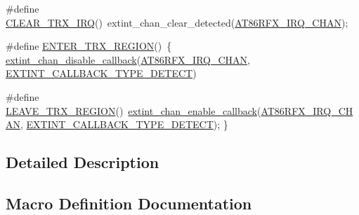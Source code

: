 \begin{DoxyCompactItemize}
\item 
\#define \mbox{\hyperlink{group__samd21__xplained__pro__group_gabb7258badbff68701ce350d608efe151}{C\+L\+E\+A\+R\+\_\+\+T\+R\+X\+\_\+\+I\+RQ}}()~extint\+\_\+chan\+\_\+clear\+\_\+detected(\mbox{\hyperlink{group__samd21__xplained__pro__group_ga59510bd28b7214b82000a06004731a8d}{A\+T86\+R\+F\+X\+\_\+\+I\+R\+Q\+\_\+\+C\+H\+AN}});
\item 
\#define \mbox{\hyperlink{group__samd21__xplained__pro__group_ga03364b3677b884617c15b752d8339e18}{E\+N\+T\+E\+R\+\_\+\+T\+R\+X\+\_\+\+R\+E\+G\+I\+ON}}()~\{ \mbox{\hyperlink{group__asfdoc__sam0__extint__group_ga939803cc928def37adf4f22bc727e8f7}{extint\+\_\+chan\+\_\+disable\+\_\+callback}}(\mbox{\hyperlink{group__samd21__xplained__pro__group_ga59510bd28b7214b82000a06004731a8d}{A\+T86\+R\+F\+X\+\_\+\+I\+R\+Q\+\_\+\+C\+H\+AN}}, \mbox{\hyperlink{group__asfdoc__sam0__extint__group_ggaf22af5117db5d011b371b05dfa8b50e3ac2e35708fbb9eb31b2a664817f108b2d}{E\+X\+T\+I\+N\+T\+\_\+\+C\+A\+L\+L\+B\+A\+C\+K\+\_\+\+T\+Y\+P\+E\+\_\+\+D\+E\+T\+E\+CT}})
\item 
\#define \mbox{\hyperlink{group__samd21__xplained__pro__group_ga4d42dd2c017ace613e800d6f7e8694bc}{L\+E\+A\+V\+E\+\_\+\+T\+R\+X\+\_\+\+R\+E\+G\+I\+ON}}()~\mbox{\hyperlink{group__asfdoc__sam0__extint__group_ga09e5568abbb3e5042b1048774a605ea4}{extint\+\_\+chan\+\_\+enable\+\_\+callback}}(\mbox{\hyperlink{group__samd21__xplained__pro__group_ga59510bd28b7214b82000a06004731a8d}{A\+T86\+R\+F\+X\+\_\+\+I\+R\+Q\+\_\+\+C\+H\+AN}}, \mbox{\hyperlink{group__asfdoc__sam0__extint__group_ggaf22af5117db5d011b371b05dfa8b50e3ac2e35708fbb9eb31b2a664817f108b2d}{E\+X\+T\+I\+N\+T\+\_\+\+C\+A\+L\+L\+B\+A\+C\+K\+\_\+\+T\+Y\+P\+E\+\_\+\+D\+E\+T\+E\+CT}}); \}
\end{DoxyCompactItemize}


\subsection{Detailed Description}


\subsection{Macro Definition Documentation}
\mbox{\label{group__samd21__xplained__pro__group_gaba085369f8aff843cee2f8057b1c58f4}} 
